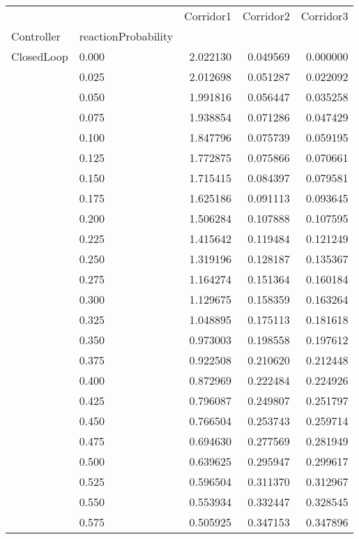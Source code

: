 \begin{tabular}{llrrr}
\toprule
         &       &  Corridor1 &  Corridor2 &  Corridor3 \\
Controller & reactionProbability &            &            &            \\
\midrule
ClosedLoop & 0.000 &   2.022130 &   0.049569 &   0.000000 \\
         & 0.025 &   2.012698 &   0.051287 &   0.022092 \\
         & 0.050 &   1.991816 &   0.056447 &   0.035258 \\
         & 0.075 &   1.938854 &   0.071286 &   0.047429 \\
         & 0.100 &   1.847796 &   0.075739 &   0.059195 \\
         & 0.125 &   1.772875 &   0.075866 &   0.070661 \\
         & 0.150 &   1.715415 &   0.084397 &   0.079581 \\
         & 0.175 &   1.625186 &   0.091113 &   0.093645 \\
         & 0.200 &   1.506284 &   0.107888 &   0.107595 \\
         & 0.225 &   1.415642 &   0.119484 &   0.121249 \\
         & 0.250 &   1.319196 &   0.128187 &   0.135367 \\
         & 0.275 &   1.164274 &   0.151364 &   0.160184 \\
         & 0.300 &   1.129675 &   0.158359 &   0.163264 \\
         & 0.325 &   1.048895 &   0.175113 &   0.181618 \\
         & 0.350 &   0.973003 &   0.198558 &   0.197612 \\
         & 0.375 &   0.922508 &   0.210620 &   0.212448 \\
         & 0.400 &   0.872969 &   0.222484 &   0.224926 \\
         & 0.425 &   0.796087 &   0.249807 &   0.251797 \\
         & 0.450 &   0.766504 &   0.253743 &   0.259714 \\
         & 0.475 &   0.694630 &   0.277569 &   0.281949 \\
         & 0.500 &   0.639625 &   0.295947 &   0.299617 \\
         & 0.525 &   0.596504 &   0.311370 &   0.312967 \\
         & 0.550 &   0.553934 &   0.332447 &   0.328545 \\
         & 0.575 &   0.505925 &   0.347153 &   0.347896 \\

\end{tabular}
